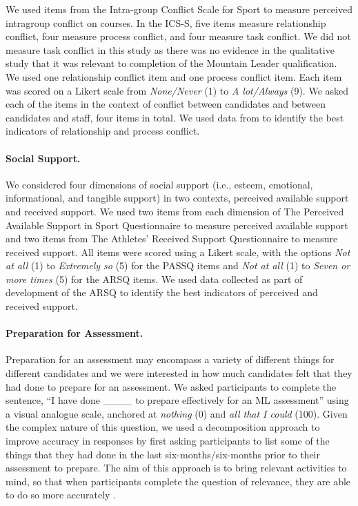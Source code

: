 \documentclass[
  12pt,
  a4paper,
]{book}
\begin{document}
We used items from the Intra-group Conflict Scale for Sport \citep[ICSS;][]{Boulter} to measure perceived intragroup conflict on courses. In the ICS-S, five items measure relationship conflict, four measure process conflict, and four measure task conflict. We did not measure task conflict in this study as there was no evidence in the qualitative study that it was relevant to completion of the Mountain Leader qualification. We used one relationship conflict item and one process conflict item. Each item was scored on a Likert scale from \emph{None/Never} (1) to \emph{A lot/Always} (9). We asked each of the items in the context of conflict between candidates and between candidates and staff, four items in total. We used data from \citet{Boulter} to identify the best indicators of relationship and process conflict.

\hypertarget{survey-tool-measures-social-support}{%
\paragraph{Social Support.}\label{survey-tool-measures-social-support}}

We considered four dimensions of social support (i.e., esteem, emotional, informational, and tangible support) in two contexts, perceived available support and received support. We used two items from each dimension of The Perceived Available Support in Sport Questionnaire \citep[PASSQ;][]{Freeman2011} to measure perceived available support and two items from The Athletes' Received Support Questionnaire \citep[ARSQ;][]{Freeman2014} to measure received support. All items were scored using a Likert scale, with the options \emph{Not at all} (1) to \emph{Extremely so} (5) for the PASSQ items and \emph{Not at all} (1) to \emph{Seven or more times} (5) for the ARSQ items. We used data collected as part of development of the ARSQ \citep{Freeman2014} to identify the best indicators of perceived and received support.

\hypertarget{survey-tool-measures-preparation}{%
\paragraph{Preparation for Assessment.}\label{survey-tool-measures-preparation}}

Preparation for an assessment may encompass a variety of different things for different candidates and we were interested in how much candidates felt that they had done to prepare for an assessment. We asked participants to complete the sentence, ``I have done \_\_\_\_ to prepare effectively for an ML assessment'' using a visual analogue scale, anchored at \emph{nothing} (0) and \emph{all that I could} (100). Given the complex nature of this question, we used a decomposition approach \citep[cf.~the World Health Organization Health and Work Performance Questionnaire][]{Kessler2003, Means1991} to improve accuracy in responses by first asking participants to list some of the things that they had done in the last six-months/six-months prior to their assessment to prepare. The aim of this approach is to bring relevant activities to mind, so that when participants complete the question of relevance, they are able to do so more accurately \citep[cf.~][]{Kessler2003}.
\end{document}
